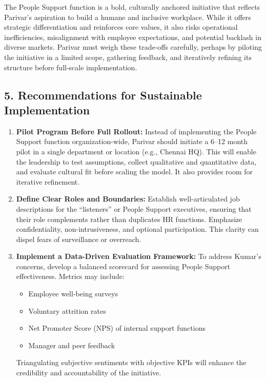 \documentclass[10pt,a4paper]{book}
\begin{document}
\begin{multicols}{2}
The People Support function is a bold, culturally anchored initiative that reflects Parivar’s aspiration to build a humane and inclusive workplace. While it offers strategic differentiation and reinforces core values, it also risks operational inefficiencies, misalignment with employee expectations, and potential backlash in diverse markets. Parivar must weigh these trade-offs carefully, perhaps by piloting the initiative in a limited scope, gathering feedback, and iteratively refining its structure before full-scale implementation.


\subsection*{5. Recommendations for Sustainable Implementation}

\begin{enumerate}
    \item \textbf{Pilot Program Before Full Rollout:} 
    Instead of implementing the People Support function organization-wide, Parivar should initiate a 6–12 month pilot in a single department or location (e.g., Chennai HQ). This will enable the leadership to test assumptions, collect qualitative and quantitative data, and evaluate cultural fit before scaling the model. It also provides room for iterative refinement.

    \item \textbf{Define Clear Roles and Boundaries:}
    Establish well-articulated job descriptions for the “listeners” or People Support executives, ensuring that their role complements rather than duplicates HR functions. Emphasize confidentiality, non-intrusiveness, and optional participation. This clarity can dispel fears of surveillance or overreach.

    \item \textbf{Implement a Data-Driven Evaluation Framework:}
    To address Kumar’s concerns, develop a balanced scorecard for assessing People Support effectiveness. Metrics may include:
    \begin{itemize}
        \item Employee well-being surveys
        \item Voluntary attrition rates
        \item Net Promoter Score (NPS) of internal support functions
        \item Manager and peer feedback
    \end{itemize}
    Triangulating subjective sentiments with objective KPIs will enhance the credibility and accountability of the initiative.


\end{enumerate}
\end{multicols}
\end{document}
